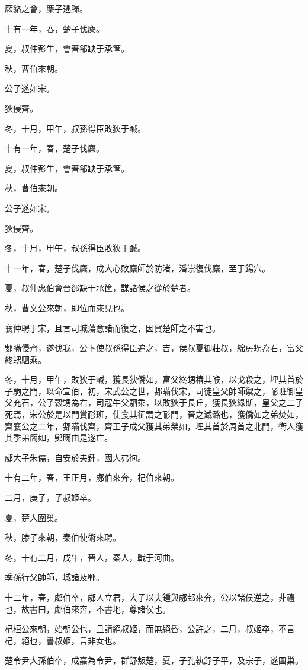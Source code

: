 \begin{pinyinscope}
厥貉之會，麇子逃歸。

十有一年，春，楚子伐麇。

夏，叔仲彭生，會晉郤缺于承筐。

秋，曹伯來朝。

公子遂如宋。

狄侵齊。

冬，十月，甲午，叔孫得臣敗狄于鹹。

十有一年，春，楚子伐麇。

夏，叔仲彭生，會晉郤缺于承筐。

秋，曹伯來朝。

公子遂如宋。

狄侵齊。

冬，十月，甲午，叔孫得臣敗狄于鹹。

十一年，春，楚子伐麇，成大心敗麇師於防渚，潘崇復伐麇，至于鍚穴。

夏，叔仲惠伯會晉郤缺于承筐，謀諸侯之從於楚者。

秋，曹文公來朝，即位而來見也。

襄仲聘于宋，且言司城蕩意諸而復之，因賀楚師之不害也。

鄋瞞侵齊，遂伐我，公卜使叔孫得臣追之，吉，侯叔夏御莊叔，綿房甥為右，富父終甥駟乘。

冬，十月，甲午，敗狄于鹹，獲長狄僑如，富父終甥樁其喉，以戈殺之，埋其首於子駒之門，以命宣伯，初，宋武公之世，鄋瞞伐宋，司徒皇父帥師禦之，耏班御皇父充石，公子穀甥為右，司寇牛父駟乘，以敗狄于長丘，獲長狄緣斯，皇父之二子死焉，宋公於是以門賞耏班，使食其征謂之耏門，晉之滅潞也，獲僑如之弟焚如，齊襄公之二年，鄋瞞伐齊，齊王子成父獲其弟榮如，埋其首於周首之北門，衛人獲其季弟簡如，鄋瞞由是遂亡。

郕大子朱儒，自安於夫鍾，國人弗徇。

十有二年，春，王正月，郕伯來奔，杞伯來朝。

二月，庚子，子叔姬卒。

夏，楚人圍巢。

秋，滕子來朝，秦伯使術來聘。

冬，十有二月，戊午，晉人，秦人，戰于河曲。

季孫行父帥師，城諸及鄆。

十二年，春，郕伯卒，郕人立君，大子以夫鍾與郕邽來奔，公以諸侯逆之，非禮也，故書曰，郕伯來奔，不書地，尊諸侯也。

杞桓公來朝，始朝公也，且請絕叔姬，而無絕昏，公許之，二月，叔姬卒，不言杞，絕也，書叔姬，言非女也。

楚令尹大孫伯卒，成嘉為令尹，群舒叛楚，夏，子孔執舒子平，及宗子，遂圍巢。


\end{pinyinscope}
